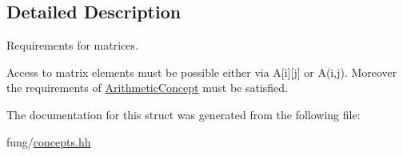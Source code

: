 \subsection{Detailed Description}
Requirements for matrices. 

Access to matrix elements must be possible either via A\mbox{[}i\mbox{]}\mbox{[}j\mbox{]} or A(i,j). Moreover the requirements of \hyperlink{structFunG_1_1Concepts_1_1ArithmeticConcept}{Arithmetic\-Concept} must be satisfied. 

The documentation for this struct was generated from the following file\-:\begin{DoxyCompactItemize}
\item 
fung/\hyperlink{concepts_8hh}{concepts.\-hh}\end{DoxyCompactItemize}
